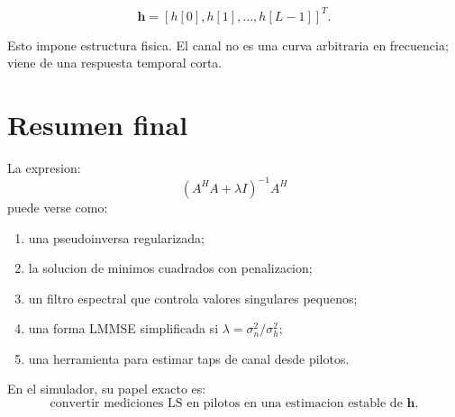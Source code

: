 \documentclass[11pt]{article}
\begin{document}
\[
    \bm h =
    [h[0],h[1],\ldots,h[L-1]]^T.
\]

Esto impone estructura fisica. El canal no es una curva arbitraria en
frecuencia; viene de una respuesta temporal corta.

\section{Resumen final}

La expresion:
\[
    (A^H A+\lambda I)^{-1}A^H
\]
puede verse como:

\begin{enumerate}
    \item una pseudoinversa regularizada;
    \item la solucion de minimos cuadrados con penalizacion;
    \item un filtro espectral que controla valores singulares pequenos;
    \item una forma LMMSE simplificada si \(\lambda=\sigma_n^2/\sigma_h^2\);
    \item una herramienta para estimar taps de canal desde pilotos.
\end{enumerate}

En el simulador, su papel exacto es:
\[
\boxed{
\text{convertir mediciones LS en pilotos en una estimacion estable de }
\bm h.
}
\]
\end{document}
